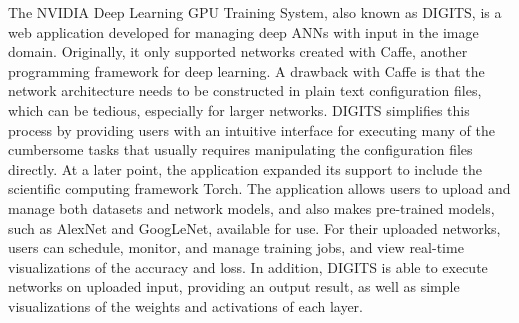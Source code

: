 \begin{comment}
\textit{The NVIDIA Deep Learning GPU Training System, also called DIGITS, is a web application developed for managing deep artificial neural networks created in Caffe, one of the leading programming frameworks for deep learning. A drawback of Caffe is that you need to construct the network architecture of a in plain text configuration files, which can be tedious, especially for large networks. DIGITS provides Caffe users with an intuitive interface for doing many of the cumbersome tasks that usually requires manipulating the configuration files. At a later point, support for the scientific computing framework Torch was also added. The application allows user to upload and manage both datasets and models, and also makes pre-trained models such as AlexNet and GoogLeNet available for use. DIGITS allows user to schedule, monitor, and manage training jobs, as well as analyzing accuracy and loss in real time. In addition, DIGITS allows you to classify images using the fully trained networks, providing simple visualizations of the weights and activations for each layer of the result.} \\

\noindent \textit{It is worth noting that DIGITS has been developed simultaneously to our visualization tool, and its current version is a significant upgrade from the version available when we first started our Specialization Project. DIGITS was an inspirational source to the problem statement, due to it only supporting the use of Caffe and Torch. The developers of DIGITS have previously stated that they are not planning on adding any more frameworks, and as late as April confirmed that they will not support TensorFlow. However, recently they announced on their website that they will be releasing DIGITS with TensorFlow support in July.}
\end{comment}

The NVIDIA Deep Learning GPU Training System, also known as DIGITS, is a web application developed for managing deep ANNs with input in the image domain. Originally, it only supported networks created with Caffe, another programming framework for deep learning. A drawback with Caffe is that the network architecture needs to be constructed in plain text configuration files, which can be tedious, especially for larger networks. DIGITS simplifies this process by providing users with an intuitive interface for executing many of the cumbersome tasks that usually requires manipulating the configuration files directly. At a later point, the application expanded its support to include the scientific computing framework Torch. The application allows users to upload and manage both datasets and network models, and also makes pre-trained models, such as AlexNet and GoogLeNet, available for use. For their uploaded networks, users can schedule, monitor, and manage training jobs, and view real-time visualizations of the accuracy and loss. In addition, DIGITS is able to execute networks on uploaded input, providing an output result, as well as simple visualizations of the weights and activations of each layer. \\

